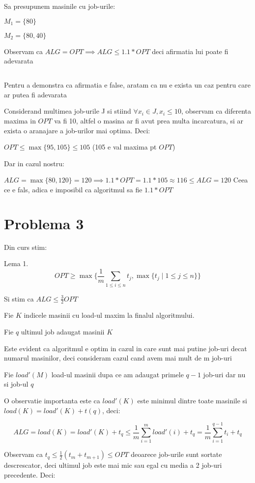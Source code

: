 \documentclass[a4paper]{report} %
\begin{document}
Sa presupunem masinile cu job-urile:

$M_{1}=\{80\}$

$M_{2}=\{80,40\}$

Observam ca $ALG=OPT \implies ALG\leq1.1*OPT$ deci afirmatia lui poate fi adevarata

\subsection{}
Pentru a demonstra ca afirmatia e false, aratam ca nu e exista un caz pentru care ar putea fi adevarata

Considerand multimea job-urile J si stiind $\forall x_{i} \in J, x_{i}\leq10$, observam ca diferenta maxima in $OPT$ va fi 10,
altfel o masina ar fi avut prea multa incarcatura, si ar exista o aranajare a job-urilor mai optima. Deci: \newline

$OPT\leq \max\{95,105\} \leq 105$ (105 e val maxima pt $OPT$)

Dar in cazul nostru:

$ALG= \max\{80,120\}=120 \implies 1.1*OPT=1.1*105\approx116\leq ALG=120$ Ceea ce e fals, adica e imposibil ca algoritmul sa fie $1.1*OPT$

\section{Problema 3}
Din curs stim:

Lema 1. \[OPT\geq \max\{\frac{1}{m} \sum_{1\leq i \leq n} t_{j} , \max\{t_{j} \mid 1\leq j \leq n\} \}\]

Si stim ca $ALG\leq \frac{3}{2}OPT$

Fie $K$ indicele masinii cu load-ul maxim la finalul algoritmului.

Fie $q$ ultimul job adaugat masinii $K$

Este evident ca algoritmul e optim in cazul in care sunt mai putine job-uri decat numarul masinilor, deci consideram cazul cand  avem mai mult de m job-uri

Fie $load'(M)$ load-ul masinii dupa ce am adaugat primele $q-1$ job-uri dar nu si job-ul $q$

O observatie importanta este ca $load'(K)$ este minimul dintre toate masinile si $load(K)=load'(K)+t(q)$, deci:

\[ALG=load(K)=load'(K)+t_{q}\leq \frac{1}{m}\sum_{i=1}^{m}load'(i)+t_{q}=\frac{1}{m}\sum_{i=1}^{q-1}t_{i}+t_{q} \]

Observam ca $t_{q}\leq \frac{1}{2}(t_{m} + t_{m+1})\leq OPT$ deoarece job-urile sunt sortate descrescator, deci ultimul job este mai mic sau egal cu media a 2 job-uri precedente. Deci:
\end{document}
